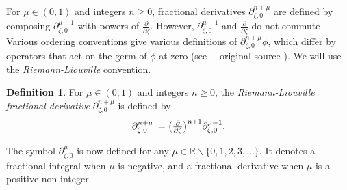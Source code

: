 \documentclass{article}
\newcommand{\R}{\mathbb{R}}
\newcommand{\fracderiv}[3]{\partial^{#1}_{#2, #3}}
\newcommand*{\defeq}{\mathrel{\vcenter{\baselineskip0.5ex \lineskiplimit0pt
                     \hbox{\scriptsize.}\hbox{\scriptsize.}}}%
                     =}
\theoremstyle{definition}
\newtheorem{definition}{Definition}[section]
\theoremstyle{plain}
\begin{document}
For $\mu \in (0, 1)$ and integers $n \ge 0$, fractional derivatives $\fracderiv{n+\mu}{\zeta}{0}$ are defined by composing $\fracderiv{\mu-1}{\zeta}{0}$ with powers of $\tfrac{\partial}{\partial \zeta}$. However, $\fracderiv{\mu-1}{\zeta}{0}$ and $\tfrac{\partial}{\partial \zeta}$ do not commute~\cite[equation 54]{mladenov2014advanced}. Various ordering conventions give various definitions of $\fracderiv{n+\mu}{\zeta}{0} \phi$, which differ by operators that act on the germ of $\phi$ at zero (see \cite[Section 1.3]{mladenov2014advanced}---original source \cite{podlubny}). We will use the {\em Riemann-Liouville} convention.
\begin{definition}\label{definition:frac_driv}
For $\mu \in (0, 1)$ and integers $n \ge 0$, the {\em Riemann-Liouville fractional derivative} $\fracderiv{n+\mu}{\zeta}{0}$ is defined by
\[ \fracderiv{n+\mu}{\zeta}{0} \defeq \big(\tfrac{\partial}{\partial \zeta}\big)^{n+1} \fracderiv{\mu-1}{\zeta}{0}. \]
\end{definition}
The symbol $\fracderiv{\mu}{\zeta}{0}$ is now defined for any $\mu \in \R \smallsetminus \{0, 1, 2, 3, \ldots\}$. It denotes a fractional integral when $\mu$ is negative, and a fractional derivative when $\mu$ is a positive non-integer.
\end{document}
